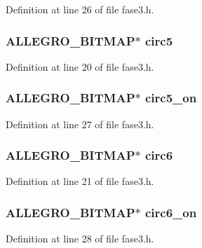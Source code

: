 Definition at line 26 of file fase3.\-h.

\hypertarget{struct_level_tres_a6444f15bb917b382f7e91576f46c2706}{
\subsubsection[{circ5}]{\setlength{\rightskip}{0pt plus 5cm}A\-L\-L\-E\-G\-R\-O\-\_\-\-B\-I\-T\-M\-A\-P$\ast$ circ5}}\label{struct_level_tres_a6444f15bb917b382f7e91576f46c2706}


Definition at line 20 of file fase3.\-h.

\hypertarget{struct_level_tres_a1537bde5184cc347504f101c712fb0ee}{
\subsubsection[{circ5\-\_\-on}]{\setlength{\rightskip}{0pt plus 5cm}A\-L\-L\-E\-G\-R\-O\-\_\-\-B\-I\-T\-M\-A\-P$\ast$ circ5\-\_\-on}}\label{struct_level_tres_a1537bde5184cc347504f101c712fb0ee}


Definition at line 27 of file fase3.\-h.

\hypertarget{struct_level_tres_a727b47ddfdf73dd07d1a2832fc0f24f9}{
\subsubsection[{circ6}]{\setlength{\rightskip}{0pt plus 5cm}A\-L\-L\-E\-G\-R\-O\-\_\-\-B\-I\-T\-M\-A\-P$\ast$ circ6}}\label{struct_level_tres_a727b47ddfdf73dd07d1a2832fc0f24f9}


Definition at line 21 of file fase3.\-h.

\hypertarget{struct_level_tres_aa380bab7c5e4a7793500bc4563c4a6bd}{
\subsubsection[{circ6\-\_\-on}]{\setlength{\rightskip}{0pt plus 5cm}A\-L\-L\-E\-G\-R\-O\-\_\-\-B\-I\-T\-M\-A\-P$\ast$ circ6\-\_\-on}}\label{struct_level_tres_aa380bab7c5e4a7793500bc4563c4a6bd}


Definition at line 28 of file fase3.\-h.

